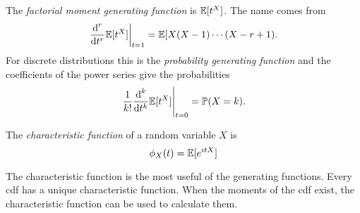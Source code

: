 \begin{definition}
    The \emph{factorial moment generating function} is $\mathbb{E}{}[t^X]$. The name comes from
    \[
        \left. \frac{\text{d}^r}{\text{d} t^r} \mathbb{E}{}[t^X] \right|_{t=1} = \mathbb{E}{}[X(X-1)\cdots(X-r+1).
    \]
    For discrete distributions this is the \emph{probability generating function} and the coefficients of the power series give the probabilities
    \[
        \left. \frac{1}{k!} \frac{\text{d}^k}{\text{d} t^k} \mathbb{E}{}[t^X] \right|_{t=0}  = \mathbb{P}{}(X=k).
    \]
\end{definition}

\begin{definition}
    The \emph{characteristic function} of a random variable $X$ is
    \[
        \phi_X(t) = \mathbb{E}{}[e^{itX}]
    \]
\end{definition}

\begin{remark}
    The characteristic function is the most useful of the generating functions. Every cdf has a unique characteristic function. When the moments of the cdf exist, the characteristic function can be used to calculate them.
\end{remark}


    


    

    

    

        




    

